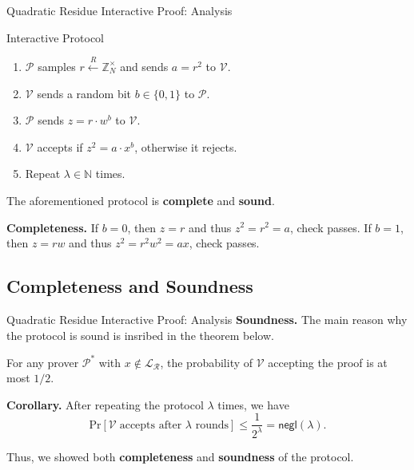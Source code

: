 \documentclass{zkdl-presentation-template}
\begin{document}
    \begin{frame}{Quadratic Residue Interactive Proof: Analysis}
        \begin{block}{Interactive Protocol}
            \begin{enumerate}
                \item $\mathcal{P}$ samples $r \xleftarrow{R} \mathbb{Z}_N^{\times}$ and sends $a = r^2$ to $\mathcal{V}$.
                \item $\mathcal{V}$ sends a random bit $b \in \{0,1\}$ to $\mathcal{P}$.
                \item $\mathcal{P}$ sends $z = r \cdot w^b$ to $\mathcal{V}$.
                \item $\mathcal{V}$ accepts if $z^2 = a \cdot x^b$, otherwise it rejects.
                \item Repeat $\lambda \in \mathbb{N}$ times.
            \end{enumerate}
        \end{block}

        \begin{lemma}
            The aforementioned protocol is \textbf{complete} and \textbf{sound}.
        \end{lemma}

        \textbf{Completeness.} If $b=0$, then $z=r$ and thus $z^2=r^2=a$, check passes. If $b=1$, then $z=rw$ and thus $z^2=r^2w^2=ax$, check passes.
    \end{frame}

    \subsection{Completeness and Soundness}
    \begin{frame}{Quadratic Residue Interactive Proof: Analysis}
        \textbf{Soundness.} The main reason why the protocol is sound is insribed in the theorem below.

        \begin{theorem}
            For any prover $\mathcal{P}^*$ with $x \not\in \mathcal{L}_{\mathcal{R}}$, the probability of $\mathcal{V}$ accepting the proof is at most $1/2$. 
        \end{theorem}

        \textbf{Corollary.} After repeating the protocol $\lambda$ times, we have
        \begin{equation*}
            \text{Pr}[\mathcal{V} \; \text{accepts after $\lambda$ rounds}] \leq \frac{1}{2^{\lambda}} = \mathsf{negl}(\lambda).
        \end{equation*}

        Thus, we showed both \textbf{completeness} and \textbf{soundness} of the protocol.
    \end{frame}
\end{document}
